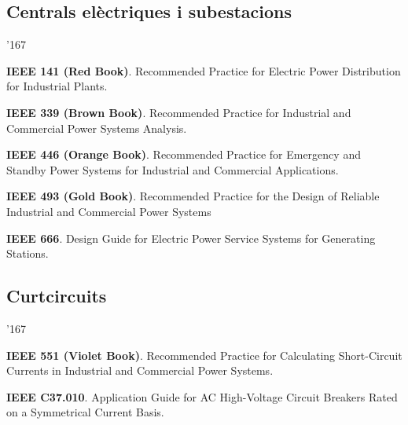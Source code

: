 \subsection*{Centrals el\`{e}ctriques i subestacions}
\begin{dinglist}{'167}
    \item \textbf{IEEE 141 (Red Book)}. Recommended Practice for Electric Power Distribution for Industrial Plants.
    \item \textbf{IEEE 339 (Brown Book)}. Recommended Practice for Industrial and Commercial Power Systems Analysis.
    \item \textbf{IEEE 446 (Orange Book)}. Recommended Practice for Emergency and Standby Power Systems for Industrial and Commercial Applications.
    \item \textbf{IEEE 493 (Gold Book)}. Recommended Practice for the Design of Reliable Industrial and Commercial Power Systems 
    \item \textbf{IEEE 666}. Design Guide for Electric Power Service Systems for Generating Stations.
\end{dinglist}

\subsection*{Curtcircuits}
\begin{dinglist}{'167}
    \item \textbf{IEEE 551 (Violet Book)}. Recommended Practice for Calculating Short-Circuit Currents in Industrial and Commercial Power Systems.
    \item \textbf{IEEE C37.010}. Application Guide for AC High-Voltage Circuit Breakers Rated on a Symmetrical Current Basis.
\end{dinglist}

